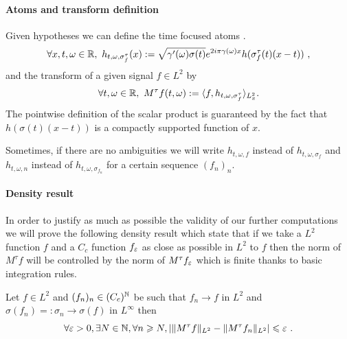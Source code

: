 \paragraph{Atoms and transform definition} Given hypotheses we can define the  time focused atoms .
\begin{equation}
	\forall x,t,\omega \in\R , \ h_{t,\omega,\sigma_f^\tau}(x):=  \sqrt{\gamma'(\omega)\sigma(t)} e^{2i\pi\gamma(\omega)x}h(\sigma_f^\tau(t)(x-t))\ ,
\end{equation}
and the transform of a given signal $f\in L^2$ by
\begin{equation}\label{eq_def_operator_time_focus}
	\forall t,\omega\in\mathbb{R}, \ M^\tau f(t,\omega) := \langle f , h_{t,\omega,\sigma_f^\tau} \rangle_{L^2_x}.
\end{equation}
The pointwise definition of the scalar product is guaranteed by the fact that $h(\sigma(t)(x-t))$ is a compactly supported function of $x$.

Sometimes, if there are no ambiguities we will write $h_{t,\omega,f}$ instead of $h_{t,\omega,\sigma_f}$ and $h_{t,\omega,n}$ instead of $h_{t,\omega,\sigma_{f_n}}$ for a certain sequence $(f_n)_n$.

\paragraph{Density result}

In order to justify as much as possible the validity of our further computations we will prove the following density result which state that if we take a $L^2$ function $f$ and a $C_c$ function $f_\varepsilon$ as close as possible in $L^2$ to $f$ then the norm of $M^\tau f$ will be controlled by the norm of $M^\tau f_\varepsilon$ which is finite thanks to basic integration rules.

\begin{lemma}\label{lemma_density_result}
    Let $f\in L^2$ and $(f_n)_n \in (C_c)^{\mathbb{N}}$ be such that $f_n \rightarrow f$ in $L^2$ and $\sigma(f_n)=:\sigma_n\rightarrow \sigma(f)$ in $L^\infty$ then
    \begin{equation}
        \forall \varepsilon>0, \exists N\in\mathbb{N}, \forall n\geqslant N, \left|\|M^\tau f\|_{L^2} - \|M^\tau f_n \|_{L^2} \right| \leqslant \varepsilon\ .
    \end{equation}
\end{lemma}

